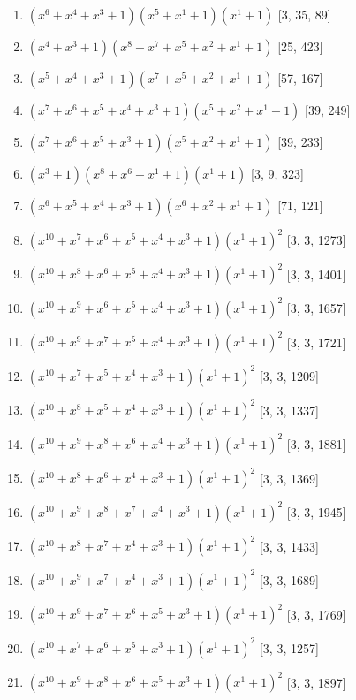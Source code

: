 \documentclass[10pt,twocolumn]{article}
\begin{document}
\begin{enumerate}
\item $(x^{6} + x^{4} + x^{3} + 1)(x^{5} + x^{1} + 1)(x^{1} + 1)$  [3, 35, 89]
\item $(x^{4} + x^{3} + 1)(x^{8} + x^{7} + x^{5} + x^{2} + x^{1} + 1)$  [25, 423]
\item $(x^{5} + x^{4} + x^{3} + 1)(x^{7} + x^{5} + x^{2} + x^{1} + 1)$  [57, 167]
\item $(x^{7} + x^{6} + x^{5} + x^{4} + x^{3} + 1)(x^{5} + x^{2} + x^{1} + 1)$  [39, 249]
\item $(x^{7} + x^{6} + x^{5} + x^{3} + 1)(x^{5} + x^{2} + x^{1} + 1)$  [39, 233]
\item $(x^{3} + 1)(x^{8} + x^{6} + x^{1} + 1)(x^{1} + 1)$  [3, 9, 323]
\item $(x^{6} + x^{5} + x^{4} + x^{3} + 1)(x^{6} + x^{2} + x^{1} + 1)$  [71, 121]
\item $(x^{10} + x^{7} + x^{6} + x^{5} + x^{4} + x^{3} + 1)(x^{1} + 1)^{2}$  [3, 3, 1273]
\item $(x^{10} + x^{8} + x^{6} + x^{5} + x^{4} + x^{3} + 1)(x^{1} + 1)^{2}$  [3, 3, 1401]
\item $(x^{10} + x^{9} + x^{6} + x^{5} + x^{4} + x^{3} + 1)(x^{1} + 1)^{2}$  [3, 3, 1657]
\item $(x^{10} + x^{9} + x^{7} + x^{5} + x^{4} + x^{3} + 1)(x^{1} + 1)^{2}$  [3, 3, 1721]
\item $(x^{10} + x^{7} + x^{5} + x^{4} + x^{3} + 1)(x^{1} + 1)^{2}$  [3, 3, 1209]
\item $(x^{10} + x^{8} + x^{5} + x^{4} + x^{3} + 1)(x^{1} + 1)^{2}$  [3, 3, 1337]
\item $(x^{10} + x^{9} + x^{8} + x^{6} + x^{4} + x^{3} + 1)(x^{1} + 1)^{2}$  [3, 3, 1881]
\item $(x^{10} + x^{8} + x^{6} + x^{4} + x^{3} + 1)(x^{1} + 1)^{2}$  [3, 3, 1369]
\item $(x^{10} + x^{9} + x^{8} + x^{7} + x^{4} + x^{3} + 1)(x^{1} + 1)^{2}$  [3, 3, 1945]
\item $(x^{10} + x^{8} + x^{7} + x^{4} + x^{3} + 1)(x^{1} + 1)^{2}$  [3, 3, 1433]
\item $(x^{10} + x^{9} + x^{7} + x^{4} + x^{3} + 1)(x^{1} + 1)^{2}$  [3, 3, 1689]
\item $(x^{10} + x^{9} + x^{7} + x^{6} + x^{5} + x^{3} + 1)(x^{1} + 1)^{2}$  [3, 3, 1769]
\item $(x^{10} + x^{7} + x^{6} + x^{5} + x^{3} + 1)(x^{1} + 1)^{2}$  [3, 3, 1257]
\item $(x^{10} + x^{9} + x^{8} + x^{6} + x^{5} + x^{3} + 1)(x^{1} + 1)^{2}$  [3, 3, 1897]

\end{enumerate}
\end{document}
